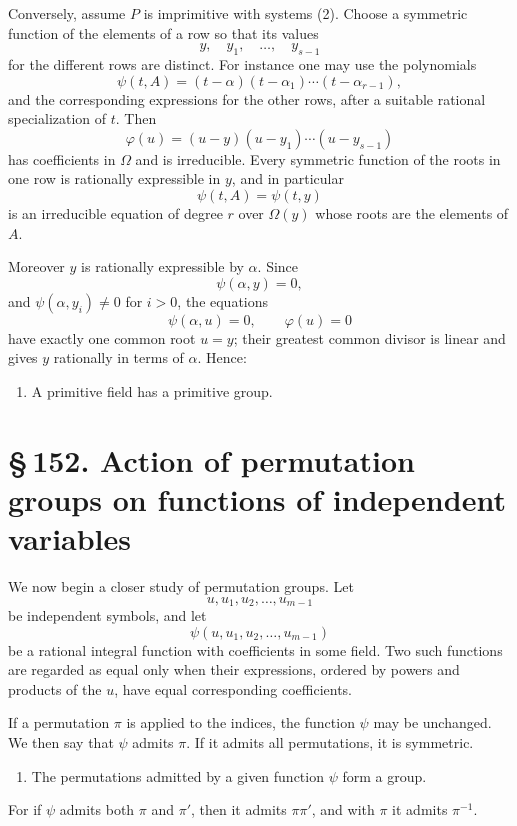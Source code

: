 \documentclass[11pt]{article}
\providecommand{\sect}[2]{\section*{\S\,#1. #2}}
\begin{document}
Conversely, assume $P$ is imprimitive with systems (2). Choose a symmetric function of the elements of a row so that its values
\[
        y,
\quad y_1,
\quad \ldots,
\quad y_{s-1}
\tag{8}
\]
for the different rows are distinct. For instance one may use the polynomials
\[
        \psi(t,A)=(t-\alpha)(t-\alpha_1)\cdots(t-\alpha_{r-1}),
\tag{9}
\]
and the corresponding expressions for the other rows, after a suitable rational specialization of $t$. Then
\[
        \varphi(u)=(u-y)(u-y_1)\cdots(u-y_{s-1})
\tag{10}
\]
has coefficients in $\Omega$ and is irreducible. Every symmetric function of the roots in one row is rationally expressible in $y$, and in particular
\[
        \psi(t,A)=\psi(t,y)
\tag{11}
\]
is an irreducible equation of degree $r$ over $\Omega(y)$ whose roots are the elements of $A$.

Moreover $y$ is rationally expressible by $\alpha$. Since
\[
        \psi(\alpha,y)=0,
\tag{12}
\]
and $\psi(\alpha,y_i)\ne0$ for $i>0$, the equations
\[
        \psi(\alpha,u)=0,
        \qquad
        \varphi(u)=0
\tag{13}
\]
have exactly one common root $u=y$; their greatest common divisor is linear and gives $y$ rationally in terms of $\alpha$. Hence:
\begin{enumerate}[label=\arabic*.,leftmargin=2em,start=3]
\item A primitive field has a primitive group.
\end{enumerate}

\sect{152}{Action of permutation groups on functions of independent variables}

We now begin a closer study of permutation groups. Let
\[
        u,u_1,u_2,
\ldots,u_{m-1}
\tag{1}
\]
be independent symbols, and let
\[
        \psi(u,u_1,u_2,
\ldots,u_{m-1})
\tag{2}
\]
be a rational integral function with coefficients in some field. Two such functions are regarded as equal only when their expressions, ordered by powers and products of the $u$, have equal corresponding coefficients.

If a permutation $\pi$ is applied to the indices, the function $\psi$ may be unchanged. We then say that $\psi$ admits $\pi$. If it admits all permutations, it is symmetric.

\begin{enumerate}[label=\arabic*.,leftmargin=2em]
\item The permutations admitted by a given function $\psi$ form a group.
\end{enumerate}
For if $\psi$ admits both $\pi$ and $\pi'$, then it admits $\pi\pi'$, and with $\pi$ it admits $\pi^{-1}$.
\end{document}
